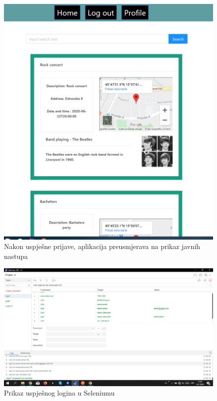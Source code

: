 			\begin{figure}[H]
				\begin{center}
					\includegraphics[width=12cm]{slike/login_redirect.PNG}
				\end{center}
				\caption{Nakon uspješne prijave, aplikacija preusmjerava na prikaz javnih nastupa}
				\label{fig:loginre}
			\end{figure}
		
			\begin{figure}[H]
				\begin{center}
					\includegraphics[width=15cm]{slike/selenium_login.PNG}
				\end{center}
				\caption{Prikaz uspješnog logina u Seleniumu}
				\label{fig:sellogin}
			\end{figure}
		
